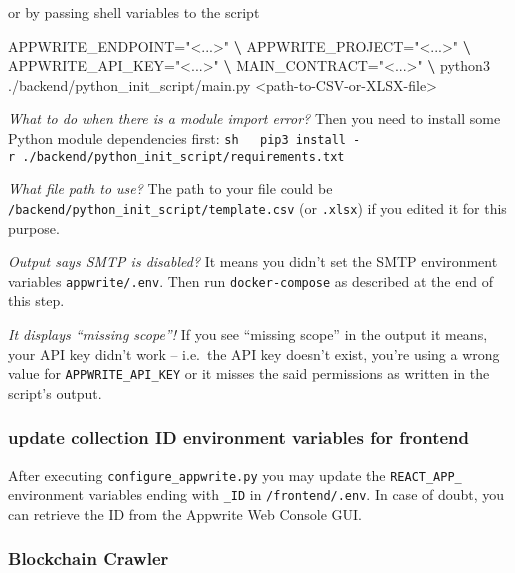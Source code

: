 \documentclass[
]{article}
\newenvironment{Shaded}{}{}
\newcommand{\ExtensionTok}[1]{#1}
\newcommand{\KeywordTok}[1]{\textcolor[rgb]{0.00,0.44,0.13}{\textbf{#1}}}
\newcommand{\NormalTok}[1]{#1}
\newcommand{\OperatorTok}[1]{\textcolor[rgb]{0.40,0.40,0.40}{#1}}
\newcommand{\StringTok}[1]{\textcolor[rgb]{0.25,0.44,0.63}{#1}}
\newcommand{\VariableTok}[1]{\textcolor[rgb]{0.10,0.09,0.49}{#1}}
\begin{document}
or by passing shell variables to the script

\begin{Shaded}
\begin{Highlighting}[]
\VariableTok{APPWRITE_ENDPOINT=}\StringTok{"<...>"} \KeywordTok{\textbackslash{}}
\VariableTok{APPWRITE_PROJECT=}\StringTok{"<...>"} \KeywordTok{\textbackslash{}}
\VariableTok{APPWRITE_API_KEY=}\StringTok{"<...>"} \KeywordTok{\textbackslash{}}
\VariableTok{MAIN_CONTRACT=}\StringTok{"<...>"} \KeywordTok{\textbackslash{}}
\ExtensionTok{python3}\NormalTok{ ./backend/python_init_script/main.py }\OperatorTok{<}\NormalTok{path-to-CSV-or-XLSX-file}\OperatorTok{>}
\end{Highlighting}
\end{Shaded}

\emph{What to do when there is a module import error?} Then you need to
install some Python module dependencies first:
\texttt{sh\ \ \ pip3\ install\ -r\ ./backend/python\_init\_script/requirements.txt}

\emph{What file path to use?} The path to your file could be
\texttt{/backend/python\_init\_script/template.csv} (or \texttt{.xlsx})
if you edited it for this purpose.

\emph{Output says SMTP is disabled?} It means you didn't set the SMTP
environment variables \texttt{appwrite/.env}. Then run
\texttt{docker-compose} as described at the end of this step.

\emph{It displays ``missing scope''!} If you see ``missing scope'' in
the output it means, your API key didn't work -- i.e.~the API key
doesn't exist, you're using a wrong value for
\texttt{APPWRITE\_API\_KEY} or it misses the said permissions as written
in the script's output.

\hypertarget{update-collection-id-environment-variables-for-frontend}{%
\subsubsection{update collection ID environment variables for
frontend}\label{update-collection-id-environment-variables-for-frontend}}

After executing \texttt{configure\_appwrite.py} you may update the
\texttt{REACT\_APP\_} environment variables ending with \texttt{\_ID} in
\texttt{/frontend/.env}. In case of doubt, you can retrieve the ID from
the Appwrite Web Console GUI.

\hypertarget{blockchain-crawler}{%
\subsubsection{Blockchain Crawler}\label{blockchain-crawler}}
\end{document}
